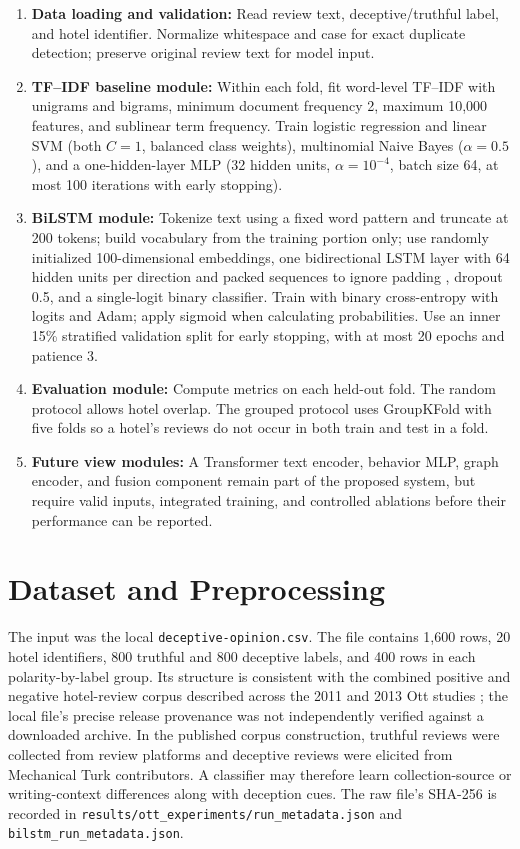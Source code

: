 \documentclass[12pt,a4paper]{report}
\begin{document}
\begin{enumerate}
    \item \textbf{Data loading and validation:} Read review text, deceptive/truthful label, and hotel identifier. Normalize whitespace and case for exact duplicate detection; preserve original review text for model input.
    \item \textbf{TF--IDF baseline module:} Within each fold, fit word-level TF--IDF with unigrams and bigrams, minimum document frequency 2, maximum 10,000 features, and sublinear term frequency. Train logistic regression and linear SVM (both $C=1$, balanced class weights), multinomial Naive Bayes ($\alpha=0.5$), and a one-hidden-layer MLP (32 hidden units, $\alpha=10^{-4}$, batch size 64, at most 100 iterations with early stopping).
    \item \textbf{BiLSTM module:} Tokenize text using a fixed word pattern and truncate at 200 tokens; build vocabulary from the training portion only; use randomly initialized 100-dimensional embeddings, one bidirectional LSTM layer with 64 hidden units per direction and packed sequences to ignore padding \cite{hochreiter1997}, dropout 0.5, and a single-logit binary classifier. Train with binary cross-entropy with logits and Adam; apply sigmoid when calculating probabilities. Use an inner 15\% stratified validation split for early stopping, with at most 20 epochs and patience 3.
    \item \textbf{Evaluation module:} Compute metrics on each held-out fold. The random protocol allows hotel overlap. The grouped protocol uses GroupKFold with five folds so a hotel's reviews do not occur in both train and test in a fold.
    \item \textbf{Future view modules:} A Transformer text encoder, behavior MLP, graph encoder, and fusion component remain part of the proposed system, but require valid inputs, integrated training, and controlled ablations before their performance can be reported.
\end{enumerate}

\section{Dataset and Preprocessing}

The input was the local \texttt{deceptive-opinion.csv}. The file contains 1,600 rows, 20 hotel identifiers, 800 truthful and 800 deceptive labels, and 400 rows in each polarity-by-label group. Its structure is consistent with the combined positive and negative hotel-review corpus described across the 2011 and 2013 Ott studies \cite{ott2011,ott2013}; the local file's precise release provenance was not independently verified against a downloaded archive. In the published corpus construction, truthful reviews were collected from review platforms and deceptive reviews were elicited from Mechanical Turk contributors. A classifier may therefore learn collection-source or writing-context differences along with deception cues. The raw file's SHA-256 is recorded in \texttt{results/ott\_experiments/run\_metadata.json} and \texttt{bilstm\_run\_metadata.json}.
\end{document}
